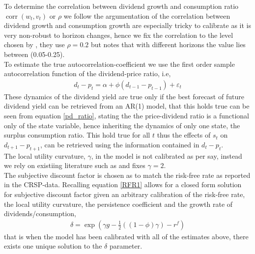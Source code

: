 To determine the correlation between dividend growth and consumption ratio ${\operatorname{corr}(w_t, v_t)}$ or $\rho$ we follow the argumentation of \citet{Campbell1999} the correlation between dividend growth and consumption growth are especially tricky to calibrate as it is very non-robust to horizon changes, hence we fix the correlation to the level chosen by \citet{Campbell1999}, they use $\rho = 0.2$ but notes that with different horizons the value lies between (0.05-0.25).\\
To estimate the true autocorrelation-coefficient we use the first order sample autocorrelation function of the dividend-price ratio, i.e,
\begin{align}
      d_t - p_t = \alpha + \phi \left( d_{t-1}-p_{t-1} \right)+\varepsilon_t
\end{align}
These dynamics of the dividend yield are true only if the best forecast of future dividend yield can be retrieved from an AR(1) model, that this holds true can be seen from equation \eqref{pd_ratio}, stating the the price-dividend ratio is a functional only of the state variable, hence inheriting the dynamics of only one state, the surplus consumption ratio. This hold true for all $t$ thus the effects of $s_t$ on $d_{t+1}-p_{t+1}$, can be retrieved using the information contained in $d_t-p_t$.\\
The local utility curvature, $\gamma$, in the model is not calibrated as per say, instead we rely on existiing literature such as \citet{Campbell1999} and fixes $\gamma = 2$.
\\
\newline
The subjective discount factor is chosen as to match the risk-free rate as reported in the CRSP-data. 
Recalling equation \eqref{RFR1} allows for a closed form solution for subjective discount factor given an arbitrary calibration of the risk-free rate, the local utility curvature, the persistence coefficient and the growth rate of dividends/consumption,
\begin{align}
    \delta = \exp{\left( \gamma g - \frac{1}{2} \left( \left(1-\phi\right)\gamma  \right) - r^{f} \right)}
\end{align}
that is when the model has been calibrated with all of the estimates above, there exists one unique solution to the $\delta$ parameter.